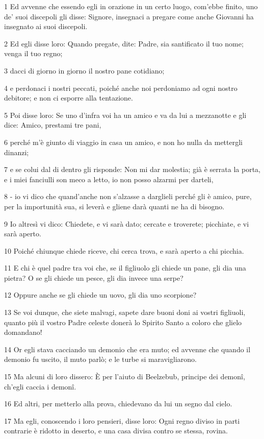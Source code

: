 \par 1 Ed avvenne che essendo egli in orazione in un certo luogo, com'ebbe finito, uno de' suoi discepoli gli disse: Signore, insegnaci a pregare come anche Giovanni ha insegnato ai suoi discepoli.
\par 2 Ed egli disse loro: Quando pregate, dite: Padre, sia santificato il tuo nome; venga il tuo regno;
\par 3 dacci di giorno in giorno il nostro pane cotidiano;
\par 4 e perdonaci i nostri peccati, poiché anche noi perdoniamo ad ogni nostro debitore; e non ci esporre alla tentazione.
\par 5 Poi disse loro: Se uno d'infra voi ha un amico e va da lui a mezzanotte e gli dice: Amico, prestami tre pani,
\par 6 perché m'è giunto di viaggio in casa un amico, e non ho nulla da mettergli dinanzi;
\par 7 e se colui dal di dentro gli risponde: Non mi dar molestia; già è serrata la porta, e i miei fanciulli son meco a letto, io non posso alzarmi per darteli,
\par 8 - io vi dico che quand'anche non s'alzasse a darglieli perché gli è amico, pure, per la importunità sua, si leverà e gliene darà quanti ne ha di bisogno.
\par 9 Io altresì vi dico: Chiedete, e vi sarà dato; cercate e troverete; picchiate, e vi sarà aperto.
\par 10 Poiché chiunque chiede riceve, chi cerca trova, e sarà aperto a chi picchia.
\par 11 E chi è quel padre tra voi che, se il figliuolo gli chiede un pane, gli dia una pietra? O se gli chiede un pesce, gli dia invece una serpe?
\par 12 Oppure anche se gli chiede un uovo, gli dia uno scorpione?
\par 13 Se voi dunque, che siete malvagi, sapete dare buoni doni ai vostri figliuoli, quanto più il vostro Padre celeste donerà lo Spirito Santo a coloro che glielo domandano!
\par 14 Or egli stava cacciando un demonio che era muto; ed avvenne che quando il demonio fu uscito, il muto parlò; e le turbe si maravigliarono.
\par 15 Ma alcuni di loro dissero: È per l'aiuto di Beelzebub, principe dei demonî, ch'egli caccia i demonî.
\par 16 Ed altri, per metterlo alla prova, chiedevano da lui un segno dal cielo.
\par 17 Ma egli, conoscendo i loro pensieri, disse loro: Ogni regno diviso in parti contrarie è ridotto in deserto, e una casa divisa contro se stessa, rovina.
